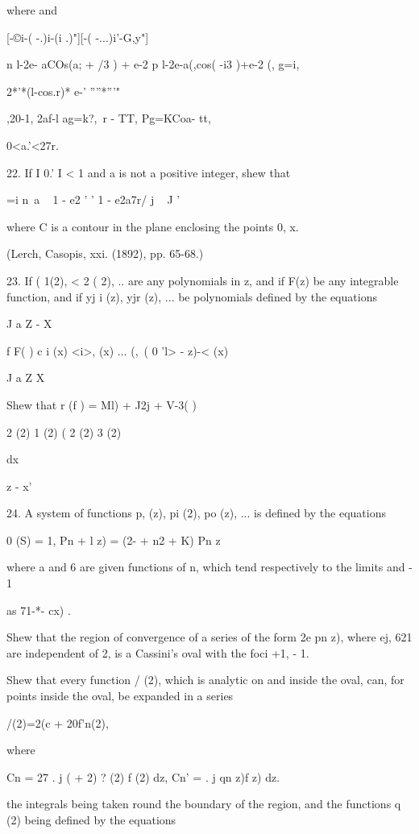 {{{where and

[-©i-( -.)i-(i .)"][-( -...)i'-G,y"]

n l-2e- aCOs(a; + /3 ) + e-2 p l-2e-a(,cos( -i3 )+e-2 (, g=i,

2*'*(l-cos.r)* e-' ''''*'''"

,20-1, 2af-l ag=k?,\ r - TT, Pg=KCoa- tt,

0<a.'<27r.


%
%

22. If I 0.' I < 1 and a is not a positive integer, shew that

 =i n~a ~ 1 - e2 ' ' 1 - e2a7r/ j ~ J '

where C is a contour in the plane enclosing the points 0, x.

(Lerch, Casopis, xxi. (1892), pp. 65-68.)

23. If ( 1(2), < 2 ( 2), .. are any polynomials in z, and if F(z) be
any integrable function, and if yj i (z), yjr (z), ... be polynomials
defined by the equations

J a Z - X

f F( ) c i (x) <i>, (x) ... (,\, ( 0 'l> - z)-< (x)

J a Z X

Shew that r (f ) = Ml) + J2j + V-3( )

2 (2) 1 (2) ( 2 (2) 3 (2)

dx

z - x'

24. A system of functions p, (z), pi (2), po (z), ... is defined by
the equations

 0 (S) = 1, Pn + l z) = (2- + n2 + K) Pn z\

where a and 6 are given functions of n, which tend respectively to the
limits and - 1

as 71-*- cx) .

Shew that the region of convergence of a series of the form 2e pn z),
where ej, 621  are independent of 2, is a Cassini's oval with the
foci +1, - 1.

Shew that every function / (2), which is analytic on and inside the
oval, can, for points inside the oval, be expanded in a series

/(2)=2(c + 20f'n(2),

where

Cn = 27 . j ( + 2) ? (2) f (2) dz, Cn' = . j qn z)f z) dz.

the integrals being taken round the boundary of the region, and the
functions q (2) being defined by the equations

}}}
